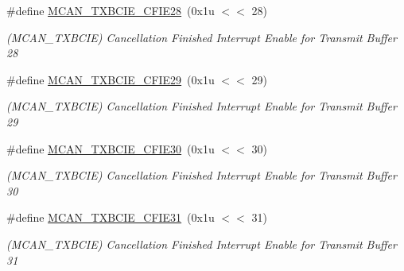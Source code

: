 \begin{DoxyCompactItemize}
\mbox{\label{group__SAMV71__MCAN_ga2b5beef3def1c3625d7aca3f6b662953}} 
\#define \mbox{\hyperlink{group__SAMV71__MCAN_ga2b5beef3def1c3625d7aca3f6b662953}{M\+C\+A\+N\+\_\+\+T\+X\+B\+C\+I\+E\+\_\+\+C\+F\+I\+E28}}~(0x1u $<$$<$ 28)
\begin{DoxyCompactList}\small\item\em (M\+C\+A\+N\+\_\+\+T\+X\+B\+C\+IE) Cancellation Finished Interrupt Enable for Transmit Buffer 28 \end{DoxyCompactList}\item 
\mbox{\label{group__SAMV71__MCAN_ga67a6d244e6a978dc96636387531d2e7d}} 
\#define \mbox{\hyperlink{group__SAMV71__MCAN_ga67a6d244e6a978dc96636387531d2e7d}{M\+C\+A\+N\+\_\+\+T\+X\+B\+C\+I\+E\+\_\+\+C\+F\+I\+E29}}~(0x1u $<$$<$ 29)
\begin{DoxyCompactList}\small\item\em (M\+C\+A\+N\+\_\+\+T\+X\+B\+C\+IE) Cancellation Finished Interrupt Enable for Transmit Buffer 29 \end{DoxyCompactList}\item 
\mbox{\label{group__SAMV71__MCAN_gafd1ab519ab1e1ef7d2a757f45b699c22}} 
\#define \mbox{\hyperlink{group__SAMV71__MCAN_gafd1ab519ab1e1ef7d2a757f45b699c22}{M\+C\+A\+N\+\_\+\+T\+X\+B\+C\+I\+E\+\_\+\+C\+F\+I\+E30}}~(0x1u $<$$<$ 30)
\begin{DoxyCompactList}\small\item\em (M\+C\+A\+N\+\_\+\+T\+X\+B\+C\+IE) Cancellation Finished Interrupt Enable for Transmit Buffer 30 \end{DoxyCompactList}\item 
\mbox{\label{group__SAMV71__MCAN_ga9b6bc6f9c8485f86b9b4206eeb62ef62}} 
\#define \mbox{\hyperlink{group__SAMV71__MCAN_ga9b6bc6f9c8485f86b9b4206eeb62ef62}{M\+C\+A\+N\+\_\+\+T\+X\+B\+C\+I\+E\+\_\+\+C\+F\+I\+E31}}~(0x1u $<$$<$ 31)
\begin{DoxyCompactList}\small\item\em (M\+C\+A\+N\+\_\+\+T\+X\+B\+C\+IE) Cancellation Finished Interrupt Enable for Transmit Buffer 31 \end{DoxyCompactList}\item 
\mbox{\label{group__SAMV71__MCAN_ga25462d8081cc657f52ab731480305ae7}} 

\end{DoxyCompactItemize}
